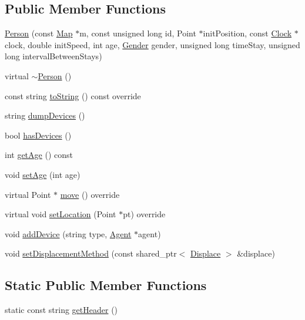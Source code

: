 \subsection*{Public Member Functions}
\begin{DoxyCompactItemize}
\item 
\hyperlink{class_person_a1fb64d7ef7c528d01dd09b2099b00e38}{Person} (const \hyperlink{class_map}{Map} $\ast$m, const unsigned long id, Point $\ast$init\+Position, const \hyperlink{class_clock}{Clock} $\ast$clock, double init\+Speed, int age, \hyperlink{class_person_aff84ca16bd4dbf364614d86f20b29dd2}{Gender} gender, unsigned long time\+Stay, unsigned long interval\+Between\+Stays)
\item 
virtual \hyperlink{class_person_a6b5729bb56531c93312b1179c8ee4b71}{$\sim$\+Person} ()
\item 
const string \hyperlink{class_person_a68872538da519d0a04297f43376db27c}{to\+String} () const override
\item 
string \hyperlink{class_person_a0bc06f77b3e8a151f8c5cc77459895c9}{dump\+Devices} ()
\item 
bool \hyperlink{class_person_a40d6f2c716dd3c9794067817a3fb9165}{has\+Devices} ()
\item 
int \hyperlink{class_person_a4b66dbee570398920b8fb6aacddd2559}{get\+Age} () const
\item 
void \hyperlink{class_person_ac8ade54c27a0657c987c395ff04a9d46}{set\+Age} (int age)
\item 
virtual Point $\ast$ \hyperlink{class_person_a922e0462a1e7eac6523a9a864ce27afc}{move} () override
\item 
virtual void \hyperlink{class_person_a05f4ac2107d59e03f0f336eda08aa358}{set\+Location} (Point $\ast$pt) override
\item 
void \hyperlink{class_person_a3ce0a72a98c2e723e48dcd7b4d9af599}{add\+Device} (string type, \hyperlink{class_agent}{Agent} $\ast$agent)
\item 
void \hyperlink{class_person_a89ada26d3541bc82e514dae833dc959d}{set\+Displacement\+Method} (const shared\+\_\+ptr$<$ \hyperlink{class_displace}{Displace} $>$ \&displace)
\end{DoxyCompactItemize}
\subsection*{Static Public Member Functions}
\begin{DoxyCompactItemize}
\item 
static const string \hyperlink{class_person_a6bebe59c354f26f4cb983185d6084181}{get\+Header} ()
\end{DoxyCompactItemize}
